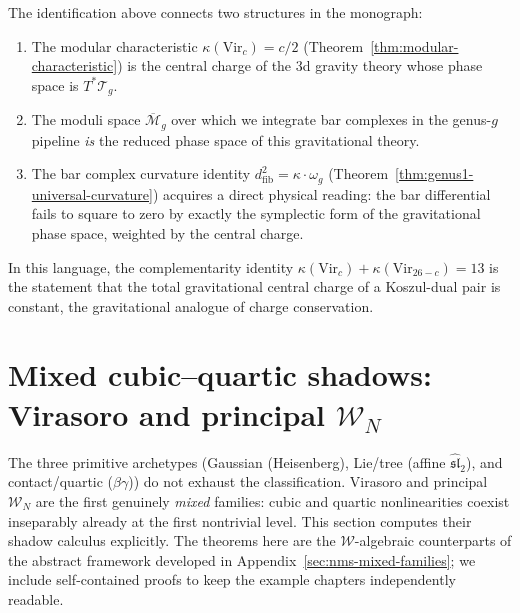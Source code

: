 \begin{remark}
\label{rem:bar-curvature-gravitational-symplectic}
The identification above connects two structures in the monograph:
\begin{enumerate}[label=(\roman*)]
\item The modular characteristic $\kappa(\mathrm{Vir}_c) = c/2$
  (Theorem~\ref{thm:modular-characteristic}) is the central charge
  of the 3d gravity theory whose phase space is $T^*\mathcal{T}_g$.
\item The moduli space $\overline{\mathcal{M}}_g$ over which we integrate
  bar complexes in the genus-$g$ pipeline \emph{is} the reduced phase
  space of this gravitational theory.
\item The bar complex curvature identity
  $d^2_{\mathrm{fib}} = \kappa \cdot \omega_g$
  (Theorem~\ref{thm:genus1-universal-curvature}) acquires a direct physical
  reading: the bar differential fails to square to zero by exactly the
  symplectic form of the gravitational phase space, weighted by the
  central charge.
\end{enumerate}
In this language, the complementarity identity
$\kappa(\mathrm{Vir}_c) + \kappa(\mathrm{Vir}_{26-c}) = 13$
is the statement that the total gravitational central charge of a
Koszul-dual pair is constant, the gravitational analogue of charge
conservation.
\end{remark}


\section{Mixed cubic--quartic shadows: Virasoro and principal \texorpdfstring{$\mathcal{W}_N$}{WN}}
\label{sec:mixed-cubic-quartic-shadows}

The three primitive archetypes (Gaussian (Heisenberg), Lie/tree
(affine $\widehat{\mathfrak{sl}}_2$), and contact/quartic ($\beta\gamma$))
do not exhaust the classification.  Virasoro and principal
$\mathcal{W}_N$ are the first genuinely \emph{mixed} families: cubic
and quartic nonlinearities coexist inseparably already at the first
nontrivial level.  This section computes their shadow calculus
explicitly.  The theorems here are the $\mathcal{W}$-algebraic
counterparts of the abstract framework developed in
Appendix~\ref{sec:nms-mixed-families}; we include self-contained proofs
to keep the example chapters independently readable.

